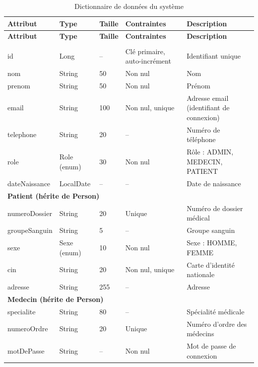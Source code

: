 \begin{center}
\small
\begin{longtable}{p{2.7cm} p{2.6cm} p{1.5cm} p{3.4cm} p{5.2cm}}
\caption{Dictionnaire de données du système}
\label{tab:dictionnaire} \\
\toprule
\textbf{Attribut} & \textbf{Type} & \textbf{Taille} & \textbf{Contraintes} & \textbf{Description} \\
\midrule
\endfirsthead
\toprule
\textbf{Attribut} & \textbf{Type} & \textbf{Taille} & \textbf{Contraintes} & \textbf{Description} \\
\midrule
\endhead
\bottomrule
\endlastfoot

\multicolumn{5}{l}{\textbf{Person (classe de base)}} \\
id & Long & -- & Clé primaire, auto-incrément & Identifiant unique \\
nom & String & 50 & Non nul & Nom \\
prenom & String & 50 & Non nul & Prénom \\
email & String & 100 & Non nul, unique & Adresse email (identifiant de connexion) \\
telephone & String & 20 & -- & Numéro de téléphone \\
role & Role (enum) & 30 & Non nul & Rôle : ADMIN, MEDECIN, PATIENT \\
dateNaissance & LocalDate & -- & -- & Date de naissance \\
\midrule

\multicolumn{5}{l}{\textbf{Patient (hérite de Person)}} \\
numeroDossier & String & 20 & Unique & Numéro de dossier médical \\
groupeSanguin & String & 5 & -- & Groupe sanguin \\
sexe & Sexe (enum) & 10 & Non nul & Sexe : HOMME, FEMME \\
cin & String & 20 & Non nul, unique & Carte d'identité nationale \\
adresse & String & 255 & -- & Adresse \\
\midrule

\multicolumn{5}{l}{\textbf{Medecin (hérite de Person)}} \\
specialite & String & 80 & -- & Spécialité médicale \\
numeroOrdre & String & 20 & Unique & Numéro d'ordre des médecins \\
motDePasse & String & -- & Non nul & Mot de passe de connexion \\
\midrule


\end{longtable}
\end{center}
